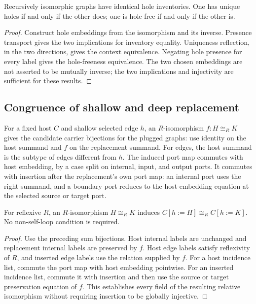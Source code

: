 \begin{theorem}
Recursively isomorphic graphs have identical hole inventories. One has unique
holes if and only if the other does; one is hole-free if and only if the other
is.
\end{theorem}
\begin{proof}
Construct hole embeddings from the isomorphism and its inverse. Presence
transport gives the two implications for inventory equality. Uniqueness
reflection, in the two directions, gives the context equivalence. Negating hole
presence for every label gives the hole-freeness equivalence. The two chosen
embeddings are not asserted to be mutually inverse; the two implications and
injectivity are sufficient for these results.
\end{proof}

\subsection{Congruence of shallow and deep replacement}

For a fixed host $C$ and shallow selected edge $h$, an $R$-isomorphism
$f:H\cong_R K$ gives the candidate carrier bijections for the plugged graphs:
use identity on the host summand and $f$ on the replacement summand. For edges,
the host summand is the subtype of edges different from $h$.
The induced port map commutes with host embedding, by a case split on internal,
input, and output ports. It commutes with insertion after the replacement's own
port map: an internal port uses the right summand, and a boundary port reduces
to the host-embedding equation at the selected source or target port.

\begin{theorem}
For reflexive $R$, an $R$-isomorphism $H\cong_R K$ induces
$C[h:=H]\cong_R C[h:=K]$. No non-self-loop condition is required.
\end{theorem}
\begin{proof}
Use the preceding sum bijections. Host internal labels are unchanged and
replacement internal labels are preserved by $f$. Host edge labels satisfy
reflexivity of $R$, and inserted edge labels use the relation supplied by $f$.
For a host incidence list, commute the port map with host embedding pointwise.
For an inserted incidence list, commute it with insertion and then use the
source or target preservation equation of $f$. This establishes every field of
the resulting relative isomorphism without requiring insertion to be globally
injective.
\end{proof}

